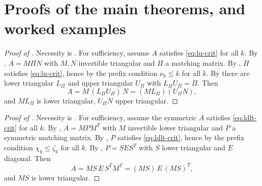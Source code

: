 \section{Proofs of the main theorems, and worked examples}\label{sec:assembly}

\begin{proof}[Proof of ]
  Necessity is .  For sufficiency, assume $A$
  satisfies \cref{eq:lu-crit} for all $k$.  By ,
  $A = M \Pi N$ with $M, N$ invertible triangular and $\Pi$ a matching
  matrix.  By , $\Pi$ satisfies
  \cref{eq:lu-crit}, hence by  the prefix condition
  $\nu_k \le k$ for all $k$.  By  there are lower
  triangular $L_\Pi$ and upper triangular $U_\Pi$ with
  $L_\Pi U_\Pi = \Pi$.  Then
  \[
    A = M \, (L_\Pi U_\Pi) \, N = (M L_\Pi)(U_\Pi N),
  \]
  and $M L_\Pi$ is lower triangular, $U_\Pi N$ upper triangular.
\end{proof}

\begin{proof}[Proof of ]
  Necessity is .  For sufficiency, assume the
  symmetric $A$ satisfies \cref{eq:ldlt-crit} for all $k$.  By
  , $A = M P M^T$ with $M$ invertible lower
  triangular and $P$ a symmetric matching matrix.  By
  , $P$ satisfies \cref{eq:ldlt-crit}, hence
  by  the prefix condition $\chi_k \le \zeta_k$ for all
  $k$.  By , $P = S E S^T$ with $S$ lower
  triangular and $E$ diagonal.  Then
  \[
    A = M S \, E \, S^T M^T = (MS) \, E \, (MS)^T,
  \]
  and $MS$ is lower triangular.
\end{proof}

